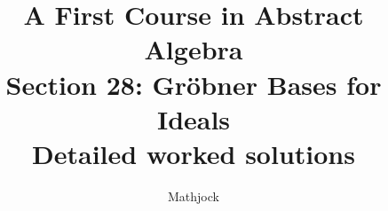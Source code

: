 
\title{\textbf{A First Course in Abstract Algebra}\\[0.3em]Section 28: Gr\"obner Bases for Ideals\\[0.3em]\large Detailed worked solutions}
\author{Mathjock}
\date{}

\maketitle
\bookinfo
\tableofcontents
\clearpage
\renewcommand{\thesection}{28}
\renewcommand{\theHsection}{fraleigh.28}


